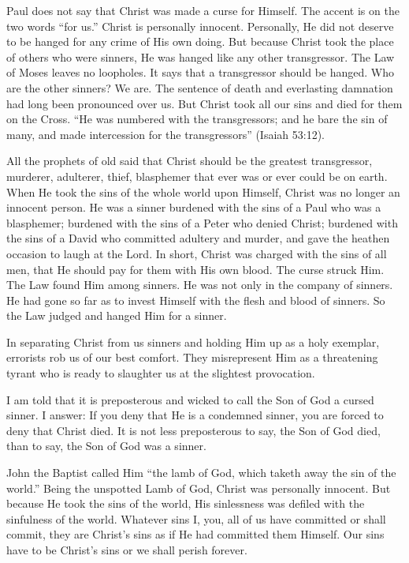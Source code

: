 Paul does not say that Christ was made a curse for Himself. The accent is on the two words “for us.” Christ is personally innocent. Personally, He did not deserve to be hanged for any crime of His own doing. But because Christ took the place of others who were sinners, He was hanged like any other transgressor. The Law of Moses leaves no loopholes. It says that a transgressor should be hanged. Who are the other sinners? We are. The sentence of death and everlasting damnation had long been pronounced over us. But Christ took all our sins and died for them on the Cross. “He was numbered with the transgressors; and he bare the sin of many, and made intercession for the transgressors” (Isaiah 53:12).

All the prophets of old said that Christ should be the greatest transgressor, murderer, adulterer, thief, blasphemer that ever was or ever could be on earth. When He took the sins of the whole world upon Himself, Christ was no longer an innocent person. He was a sinner burdened with the sins of a Paul who was a blasphemer; burdened with the sins of a Peter who denied Christ; burdened with the sins of a David who committed adultery and murder, and gave the heathen occasion to laugh at the Lord. In short, Christ was charged with the sins of all men, that He should pay for them with His own blood. The curse struck Him. The Law found Him among sinners. He was not only in the company of sinners. He had gone so far as to invest Himself with the flesh and blood of sinners. So the Law judged and hanged Him for a sinner.

In separating Christ from us sinners and holding Him up as a holy exemplar, errorists rob us of our best comfort. They misrepresent Him as a threatening tyrant who is ready to slaughter us at the slightest provocation.

I am told that it is preposterous and wicked to call the Son of God a cursed sinner. I answer: If you deny that He is a condemned sinner, you are forced to deny that Christ died. It is not less preposterous to say, the Son of God died, than to say, the Son of God was a sinner.

John the Baptist called Him “the lamb of God, which taketh away the sin of the world.” Being the unspotted Lamb of God, Christ was personally innocent. But because He took the sins of the world, His sinlessness was defiled with the sinfulness of the world. Whatever sins I, you, all of us have committed or shall commit, they are Christ’s sins as if He had committed them Himself. Our sins have to be Christ’s sins or we shall perish forever.

